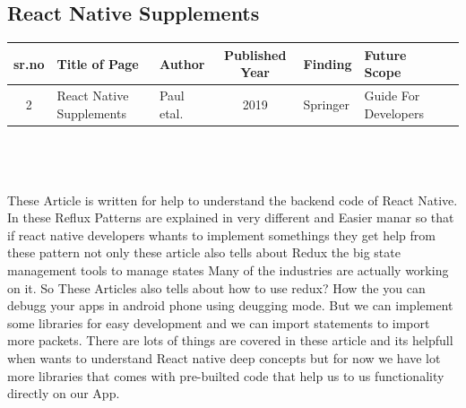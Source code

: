 \documentclass[12pt,a4paper]{article}
\begin{document}
\subsection*{React Native Supplements}
\begin{tabular}{ |c | m{2.5cm} | m{2cm}| c | m{2cm} | m{2cm} | c | }

 \hline
  sr.no & Title of Page & Author & Published Year & Finding & Future Scope  \\ 
  \hline
  2 & React Native Supplements & Paul etal. &  2019 & Springer & Guide For Developers \\
\hline 
  
\end{tabular}
\\
\\
\\
These Article is written for help to understand the backend code of React Native. In these Reflux Patterns are explained in very different and Easier manar so that if react native developers whants to implement somethings they get help from these pattern not only these article also tells about Redux the big state management tools to manage states Many of the industries are actually working on it.
So These Articles also tells about how to use redux? How the you can debugg your apps in android phone using deugging mode. But we can implement some libraries for easy development and we can import statements to import more packets. There are lots of things are covered in these article and its helpfull when wants to understand React native deep concepts but for now we have lot more libraries that comes with pre-builted code that help us to us functionality directly on our App.


\newpage
\end{document}
